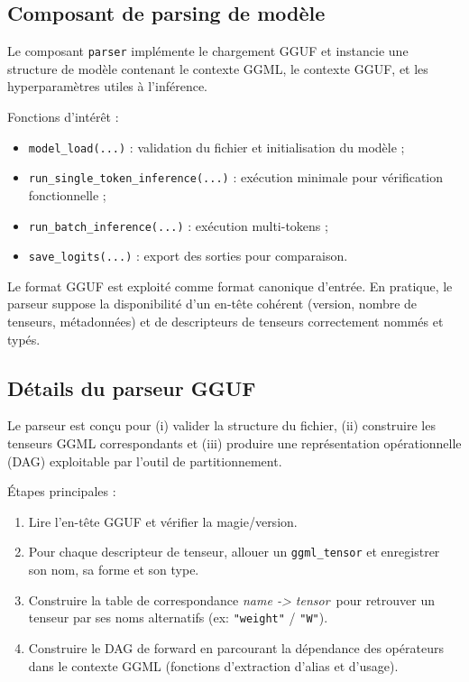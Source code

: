\documentclass[11pt,a4paper]{article}
\begin{document}
\subsection{Composant de parsing de mod\`ele}

Le composant \texttt{parser} impl\'emente le chargement GGUF et instancie une structure de mod\`ele contenant le contexte GGML, le contexte GGUF, et les hyperparam\`etres utiles \`a l'inf\'erence.

Fonctions d'int\'er\^et :
\begin{itemize}[leftmargin=*]
	\item \texttt{model\_load(...)} : validation du fichier et initialisation du mod\`ele ;
	\item \texttt{run\_single\_token\_inference(...)} : ex\'ecution minimale pour v\'erification fonctionnelle ;
	\item \texttt{run\_batch\_inference(...)} : ex\'ecution multi-tokens ;
	\item \texttt{save\_logits(...)} : export des sorties pour comparaison.
\end{itemize}

Le format GGUF est exploit\'e comme format canonique d'entr\'ee. En pratique, le parseur suppose la disponibilit\'e d'un en-t\^ete coh\'erent (version, nombre de tenseurs, m\'etadonn\'ees) et de descripteurs de tenseurs correctement nomm\'es et typ\'es.

\subsection{D\'etails du parseur GGUF}

Le parseur est con\c{c}u pour (i) valider la structure du fichier, (ii) construire les tenseurs GGML correspondants et (iii) produire une repr\'esentation op\'erationnelle (DAG) exploitable par l'outil de partitionnement.

Étapes principales :
\begin{enumerate}[leftmargin=*]
	\item Lire l'en-t\^ete GGUF et v\'erifier la magie/version.
	\item Pour chaque descripteur de tenseur, allouer un \texttt{ggml\_tensor} et enregistrer son nom, sa forme et son type.
	\item Construire la table de correspondance \textit{name -> tensor}\ pour retrouver un tenseur par ses noms alternatifs (ex: \texttt{"weight"} / \texttt{"W"}).
	\item Construire le DAG de forward en parcourant la d\'ependance des op\'erateurs dans le contexte GGML (fonctions d'extraction d'alias et d'usage).
\end{enumerate}
\end{document}
